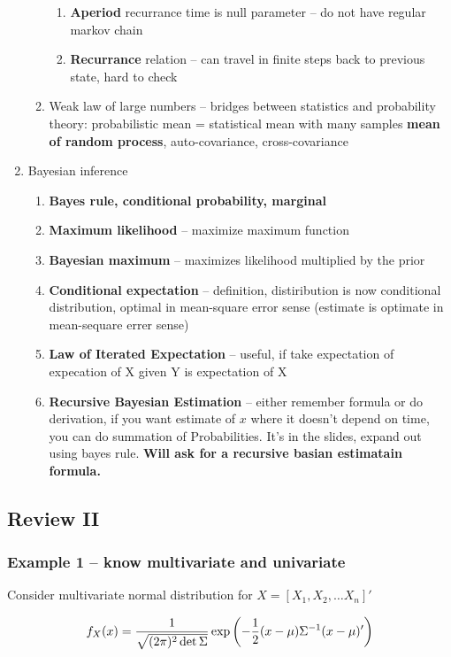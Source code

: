 \documentclass{report}
\DeclarePairedDelimiter\autobracket{(}{)}
\newcommand{\br}[1]{\autobracket*{#1}}
\begin{document}
\begin{enumerate}
\begin{enumerate}
\begin{enumerate}
 
 \item \textbf{Aperiod} recurrance time is null parameter -- do not have regular markov chain
 \item \textbf{Recurrance} relation -- can travel in finite steps back to previous state, hard to check
 \end{enumerate}
 \item Weak law of large numbers -- bridges between statistics and probability theory: probabilistic mean = statistical mean with many samples
 \textbf{mean of random process}, auto-covariance, cross-covariance
 \end{enumerate}
 \item Bayesian inference 
 \begin{enumerate}
 \item \textbf{Bayes rule, conditional probability, marginal }
 \item \textbf{Maximum likelihood } -- maximize maximum function
 \item \textbf{Bayesian maximum} -- maximizes likelihood multiplied by the prior
 \item \textbf{Conditional expectation} -- definition, distiribution is now conditional distribution, optimal in mean-square error sense (estimate is optimate in mean-sequare errer sense) 
 \item \textbf{Law of Iterated Expectation} -- useful, if take expectation of expecation of X given Y is expectation of X
 \item \textbf{Recursive Bayesian Estimation} -- either remember formula or do derivation, if you want estimate of $x$ where it doesn't depend on time, you can do summation of Probabilities. It's in the slides, expand out using bayes rule.\textbf{ Will ask for a recursive basian estimatain formula.}
 \end{enumerate}
 \end{enumerate}

\subsection{Review II}

\subsubsection{Example 1 -- know multivariate and univariate}

Consider multivariate normal distribution for $X=[X_1, X_2, \dots X_n]'$

$$f_X(x) = \frac{1}{\sqrt{(2\pi)^2 \det{\Sigma}}} \exp{ \br{ -\frac{1}{2} (x-\mu) \Sigma^{-1}(x-\mu)' } }$$
\end{document}
